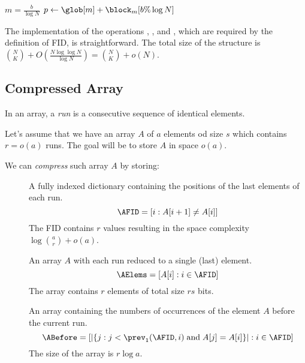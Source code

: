\begin{algorithm}
\begin{algorithmic}
 
	\State $m = \frac{b}{\log N}$
	\State $p \gets \glob[m] + \block_m[b \% \log N]$
	\State {}
\EndFunction
\end{algorithmic}
\end{algorithm}

The implementation of the operations \rank{}, \select{}, and \inspect{}, which are required by the definition of FID, is straightforward.
The total size of the structure is ${N \choose K} + O(\frac{N \log \log N}{\log N}) = {N \choose K} + o(N)$.

\subsection{Compressed Array}\label{s:compressed-array}

In an array, a \emph{run} is a consecutive sequence of identical elements.

Let's assume that we have an array $A$ of $a$ elements od size $s$ which contains $r = o(a)$ runs.
The goal will be to store $A$ in space $o(a)$.

We can \emph{compress} such array $A$ by storing:
\begin{description}
	\item[\AFID]
	A fully indexed dictionary containing the positions of the last elements of each run.
	$$ \AFID = [i : A[i + 1] \ne A[i]] $$
	The FID contains $r$ values resulting in the space complexity $\log {a \choose r} + o(a)$.

	\item[\AElems]
	An array $A$ with each run reduced to a single (last) element.
	$$ \AElems = [A[i] : i \in \AFID] $$
	The array contains $r$ elements of total size $rs$ bits.
	
	\item[\ABefore]
	An array containing the numbers of occurrences of the element $A$ before the current run.
	$$ \ABefore = [|\{ j : j < \prev_1(\AFID, i) \booland A[j] = A[i] \}| : i \in \AFID ] $$
	The size of the array is $r \log a$.
\end{description}


